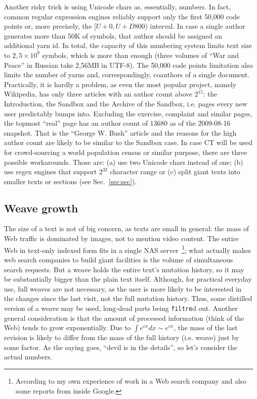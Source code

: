 \documentclass{acm_proc_article-sp}
\begin{document}
Another risky trick is using Unicode chars as, essentially, numbers.
In fact, common regular expression engines reliably support only the first 50,000 code points or, more precisely, the $[U+0,U+D800)$ interval. 
In case a single author generates more than 50K of symbols, that author should be assigned an additional yarn id.
In total, the capacity of this numbering system limits text size to $2,5\times10^9$ symbols, which is more than enough (three volumes of ``War and Peace'' in Russian take 2,56MB in UTF-8). 
The 50,000 code points limitation also limits the number of yarns and, correspondingly, coauthors of a single document.
Practically, it is hardly a problem, as even the most popular project, namely Wikipedia, has only three articles with an author count above $2^{15}$: the Introduction, the Sandbox and the Archive of the Sandbox, i.e. pages every new user predictably bumps into.
Excluding the exercise, complaint and similar pages, the topmost ``real'' page has an author count of 13680 as of the 2009-08-16 snapshot.
That is the ``George W. Bush'' article and the reasons for the high author count are likely to be similar to the Sandbox case.
In case CT will be used for crowd-sourcing a world population census or similar purpose, there are three possible workarounds. Those are: (a) use two Unicode chars instead of one; (b) use regex engines that support $2^{32}$ character range or (c) split giant texts into smaller texts or sections (see Sec.~\ref{sec:sec}).

\subsection{Weave growth}	\label{sec:weave-growth}

The size of a text is not of big concern, as texts are small in general: the mass of Web traffic is dominated by images, not to mention video content.
The entire Web in text-only indexed form fits in a single NAS server~\footnote{According to my own experience of work in a Web search company and also some reports from inside Google.}; what actually makes web search companies to build giant facilities is the volume of simultaneous search requests.
But a weave holds the entire text's mutation history, so it may be substantially bigger than the plain text itself.
Although, for practical everyday use, full weaves are not necessary, as the user is more likely to be interested in the changes since the last visit, not the full mutation history.
Thus, some distilled version of a weave may be used, long-dead parts being {\tt filtre}d out.
Another general consideration is that the amount of processed information (think of the Web) tends to grow exponentially. Due to $\int e^{cx}dx \sim e^{cx}$, the mass of the last revision is likely to differ from the mass of the full history (i.e. weave) just by some factor.
As the saying goes, ``devil is in the details'', so let's consider the actual numbers.
\end{document}
